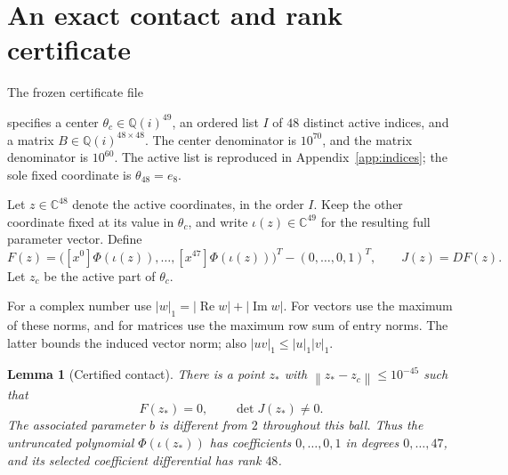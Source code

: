 \documentclass[11pt]{article}
\newtheorem{lemma}[theorem]{Lemma}
\newcommand{\C}{\mathbb C}
\newcommand{\coeff}[1]{[x^{#1}]}
\newcommand{\norm}[1]{\left\lVert #1\right\rVert}
\begin{document}
\section{An exact contact and rank certificate}\label{sec:certificate}

The frozen certificate file
\begin{center}
\end{center}
specifies a center $\theta_c\in\mathbb Q(i)^{49}$, an ordered list
$I$ of $48$ distinct active indices, and a matrix
$B\in\mathbb Q(i)^{48\times48}$. The center denominator is $10^{70}$,
and the matrix denominator is $10^{60}$. The active list is reproduced
in Appendix~\ref{app:indices}; the sole fixed coordinate is
$\theta_{48}=e_8$.

Let $z\in\C^{48}$ denote the active coordinates, in the order $I$.
Keep the other coordinate fixed at its value in $\theta_c$, and write
$\iota(z)\in\C^{49}$ for the resulting full parameter vector. Define
\begin{equation}\label{eq:contact-equations}
 F(z)=\bigl(\coeff0\Phi(\iota(z)),\ldots,
             \coeff{47}\Phi(\iota(z))\bigr)^T
            -(0,\ldots,0,1)^T,
 \qquad J(z)=DF(z).
\end{equation}
Let $z_c$ be the active part of $\theta_c$.

For a complex number use $|w|_1=|\operatorname{Re}w|+
|\operatorname{Im}w|$. For vectors use the maximum of these norms,
and for matrices use the maximum row sum of entry norms. The latter
bounds the induced vector norm; also $|uv|_1\le |u|_1|v|_1$.

\begin{lemma}[Certified contact]\label{lem:contact}
There is a point $z_*$ with $\norm{z_*-z_c}\le10^{-45}$ such that
\[
 F(z_*)=0,\qquad \det J(z_*)\ne0.
\]
The associated parameter $b$ is different from $2$ throughout this ball.
Thus the untruncated polynomial $\Phi(\iota(z_*))$ has coefficients
$0,\ldots,0,1$ in degrees $0,\ldots,47$, and its selected coefficient
differential has rank $48$.
\end{lemma}
\end{document}
